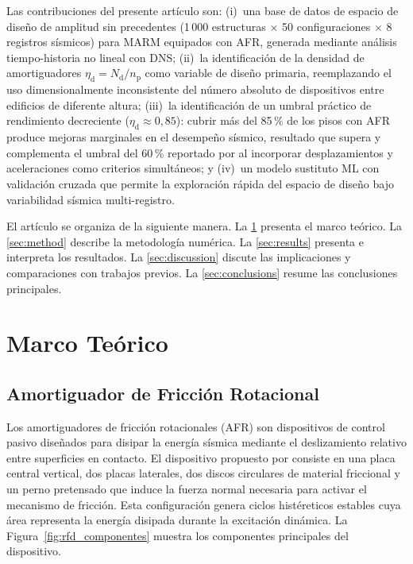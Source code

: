 \documentclass[preprint,12pt,authoryear]{elsarticle}
\newcommand{\nd}{N_{\mathrm{d}}}
\newcommand{\np}{n_{\mathrm{p}}}              %
\newcommand{\etad}{\eta_{\mathrm{d}}}
\begin{document}
Las contribuciones del presente artículo son: (i)~una base de datos de espacio
de diseño de amplitud sin precedentes (1\,000 estructuras $\times$ 50
configuraciones $\times$ 8 registros sísmicos) para MARM equipados con AFR,
generada mediante análisis tiempo-historia no lineal con DNS; (ii)~la
identificación de la densidad de amortiguadores $\etad = \nd/\np$ como variable
de diseño primaria, reemplazando el uso dimensionalmente inconsistente del número
absoluto de dispositivos entre edificios de diferente altura; (iii)~la identificación de un umbral práctico de rendimiento decreciente
($\etad \approx 0{,}85$): cubrir más del 85\,\% de los pisos con AFR produce
mejoras marginales en el desempeño sísmico, resultado que supera y complementa
el umbral del 60\,\% reportado por \citet{Jarrahi2020sdee} al incorporar
desplazamientos y aceleraciones como criterios simultáneos; y
(iv)~un modelo sustituto ML con validación cruzada que permite la exploración
rápida del espacio de diseño bajo variabilidad sísmica multi-registro.

El artículo se organiza de la siguiente manera. La \cref{sec:theory} presenta el
marco teórico. La \cref{sec:method} describe la metodología numérica. La
\cref{sec:results} presenta e interpreta los resultados. La \cref{sec:discussion}
discute las implicaciones y comparaciones con trabajos previos. La
\cref{sec:conclusions} resume las conclusiones principales.

\section{Marco Teórico}
\label{sec:theory}

\subsection{Amortiguador de Fricción Rotacional}
\label{sec:theory:afr}

Los amortiguadores de fricción rotacionales (AFR) son dispositivos de control
pasivo diseñados para disipar la energía sísmica mediante el deslizamiento
relativo entre superficies en contacto. El dispositivo propuesto por
\citet{Mualla2002} consiste en una placa central vertical, dos placas laterales,
dos discos circulares de material friccional y un perno pretensado que induce la
fuerza normal necesaria para activar el mecanismo de fricción. Esta configuración
genera ciclos histéreticos estables cuya área representa la energía disipada
durante la excitación dinámica. La Figura~\ref{fig:rfd_componentes} muestra
los componentes principales del dispositivo.
\end{document}
